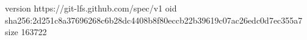 version https://git-lfs.github.com/spec/v1
oid sha256:2d251c8a37696268c6b28dc4408b8f80eccb22b39619c07ac26edc0d7ec355a7
size 163722

